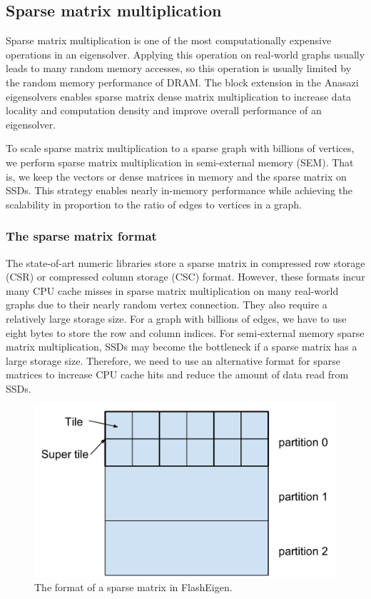\subsection{Sparse matrix multiplication} \label{spmm}
Sparse matrix multiplication is one of the most computationally expensive
operations in an eigensolver. Applying this operation on real-world graphs
usually leads to many random memory accesses, so this operation is usually
limited by the random memory performance of DRAM. The block extension
in the Anasazi eigensolvers enables sparse matrix dense matrix multiplication
to increase data locality and computation density and improve overall performance
of an eigensolver.

To scale sparse matrix multiplication to a sparse graph with billions of vertices,
we perform sparse matrix multiplication in semi-external memory (SEM). That is,
we keep the vectors or dense matrices in memory and the sparse
matrix on SSDs. This strategy enables nearly in-memory performance while achieving
the scalability in proportion to the ratio of edges to vertices in a graph.

\subsubsection{The sparse matrix format}
The state-of-art numeric libraries store a sparse matrix in compressed row storage
(CSR) or compressed column storage (CSC) format. However, these formats incur
many CPU cache misses in sparse matrix multiplication on many real-world graphs
due to their nearly random vertex connection. They also require a relatively
large storage size. For a graph with billions of edges, we have to use eight
bytes to store the row and column indices. For semi-external memory sparse
matrix multiplication, SSDs may become the bottleneck if a sparse matrix has
a large storage size.
Therefore, we need to use an alternative format for sparse matrices to increase
CPU cache hits and reduce the amount of data read from SSDs.

\begin{figure}
\centering
\includegraphics[scale=0.3]{./sparse_mat.pdf}
\vspace{-5pt}
\caption{The format of a sparse matrix in FlashEigen.}
\vspace{-5pt}
\label{sparse_mat}
\end{figure}

